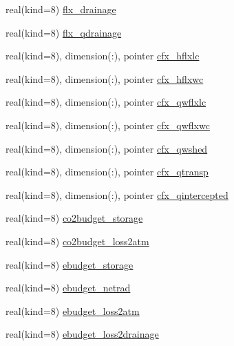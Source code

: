 \begin{DoxyCompactItemize}
\item 
real(kind=8) \hyperlink{structrk4__coms_1_1rk4patchtype_a9fde10f51f81369105b788588e33d8cb}{flx\+\_\+drainage}
\item 
real(kind=8) \hyperlink{structrk4__coms_1_1rk4patchtype_a3b54af378e40a9c5e5c4ba7af558c7ce}{flx\+\_\+qdrainage}
\item 
real(kind=8), dimension(\+:), pointer \hyperlink{structrk4__coms_1_1rk4patchtype_a2e06dbed0fb5d2f52c41fcef658fc951}{cfx\+\_\+hflxlc}
\item 
real(kind=8), dimension(\+:), pointer \hyperlink{structrk4__coms_1_1rk4patchtype_aeecbd3a3c2ff08626106040c9be39857}{cfx\+\_\+hflxwc}
\item 
real(kind=8), dimension(\+:), pointer \hyperlink{structrk4__coms_1_1rk4patchtype_a155ff05670b43f191ebf35b867cdbb6e}{cfx\+\_\+qwflxlc}
\item 
real(kind=8), dimension(\+:), pointer \hyperlink{structrk4__coms_1_1rk4patchtype_a4ce3e18ac5064a584fcf9db30fe939dd}{cfx\+\_\+qwflxwc}
\item 
real(kind=8), dimension(\+:), pointer \hyperlink{structrk4__coms_1_1rk4patchtype_a152ab5751f74159311c190823adcfb3b}{cfx\+\_\+qwshed}
\item 
real(kind=8), dimension(\+:), pointer \hyperlink{structrk4__coms_1_1rk4patchtype_a624a3e7d9ea459587cd76b78fa44f45c}{cfx\+\_\+qtransp}
\item 
real(kind=8), dimension(\+:), pointer \hyperlink{structrk4__coms_1_1rk4patchtype_ab601071ca0d9d397a7004e737b092861}{cfx\+\_\+qintercepted}
\item 
real(kind=8) \hyperlink{structrk4__coms_1_1rk4patchtype_aa7c6982ce419cd526a23e7a8ed6c3a65}{co2budget\+\_\+storage}
\item 
real(kind=8) \hyperlink{structrk4__coms_1_1rk4patchtype_af0dfb98a6d25f6930335540f620fa56b}{co2budget\+\_\+loss2atm}
\item 
real(kind=8) \hyperlink{structrk4__coms_1_1rk4patchtype_aa3f6b5b5a36b5d84273d929c78186db2}{ebudget\+\_\+storage}
\item 
real(kind=8) \hyperlink{structrk4__coms_1_1rk4patchtype_a83c79518823b1f014a8877412f99ba42}{ebudget\+\_\+netrad}
\item 
real(kind=8) \hyperlink{structrk4__coms_1_1rk4patchtype_a4d870f7c5aad41344d45b462e960a535}{ebudget\+\_\+loss2atm}
\item 
real(kind=8) \hyperlink{structrk4__coms_1_1rk4patchtype_a051cdaa0b1680b046d99ed9747e31e79}{ebudget\+\_\+loss2drainage}
\item 

\end{DoxyCompactItemize}
